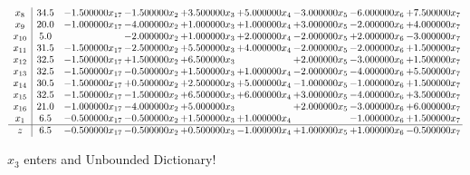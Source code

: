 \documentclass[10pt]{article}
\begin{document}
 \[\begin{array}{c| c c@{\hskip 2pt} c@{\hskip 2pt} c@{\hskip 2pt} c@{\hskip 2pt} c@{\hskip 2pt} c@{\hskip 2pt} c@{\hskip 2pt} }
 x_{8}   &  34.5 & -1.500000 x_{17} & -1.500000 x_{2} & + 3.500000 x_{3} & + 5.000000 x_{4} & -3.000000 x_{5} & -6.000000 x_{6} & + 7.500000 x_{7}\\
 x_{9}   &  20.0 & -1.000000 x_{17} & -4.000000 x_{2} & + 1.000000 x_{3} & + 1.000000 x_{4} & + 3.000000 x_{5} & -2.000000 x_{6} & + 4.000000 x_{7}\\
 x_{10}   &  5.0  &   & -2.000000 x_{2} & + 1.000000 x_{3} & + 2.000000 x_{4} & -2.000000 x_{5} & + 2.000000 x_{6} & -3.000000 x_{7}\\
 x_{11}   &  31.5 & -1.500000 x_{17} & -2.500000 x_{2} & + 5.500000 x_{3} & + 4.000000 x_{4} & -2.000000 x_{5} & -2.000000 x_{6} & + 1.500000 x_{7}\\
 x_{12}   &  32.5 & -1.500000 x_{17} & + 1.500000 x_{2} & + 6.500000 x_{3} &   & + 2.000000 x_{5} & -3.000000 x_{6} & + 1.500000 x_{7}\\
 x_{13}   &  32.5 & -1.500000 x_{17} & -0.500000 x_{2} & + 1.500000 x_{3} & + 1.000000 x_{4} & -2.000000 x_{5} & -4.000000 x_{6} & + 5.500000 x_{7}\\
 x_{14}   &  30.5 & -1.500000 x_{17} & + 0.500000 x_{2} & + 2.500000 x_{3} & + 5.000000 x_{4} & -1.000000 x_{5} & -1.000000 x_{6} & + 1.500000 x_{7}\\
 x_{15}   &  32.5 & -1.500000 x_{17} & -1.500000 x_{2} & + 6.500000 x_{3} & + 6.000000 x_{4} & + 3.000000 x_{5} & -4.000000 x_{6} & + 3.500000 x_{7}\\
 x_{16}   &  21.0 & -1.000000 x_{17} & -4.000000 x_{2} & + 5.000000 x_{3} &   & + 2.000000 x_{5} & -3.000000 x_{6} & + 6.000000 x_{7}\\
 x_{1}   &  6.5 & -0.500000 x_{17} & -0.500000 x_{2} & + 1.500000 x_{3} & + 1.000000 x_{4} &   & -1.000000 x_{6} & + 1.500000 x_{7}\\
\hline
z    &  6.5 & -0.500000 x_{17} & -0.500000 x_{2} & + 0.500000 x_{3} & -1.000000 x_{4} & + 1.000000 x_{5} & + 1.000000 x_{6} & -0.500000 x_{7}\\
\end{array}\]


 $ x_{3} $ enters and Unbounded Dictionary!
\end{document}
